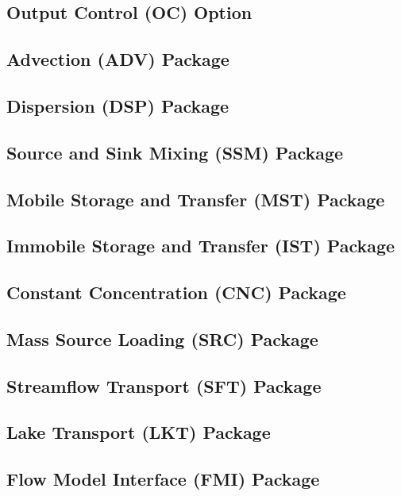 \newpage
\subsection{Output Control (OC) Option}


\newpage
\subsection{Advection (ADV) Package}


\newpage
\subsection{Dispersion (DSP) Package}


\newpage
\subsection{Source and Sink Mixing (SSM) Package}


\newpage
\subsection{Mobile Storage and Transfer (MST) Package}


\newpage
\subsection{Immobile Storage and Transfer (IST) Package}


\newpage
\subsection{Constant Concentration (CNC) Package}


\newpage
\subsection{Mass Source Loading (SRC) Package}


\newpage
\subsection{Streamflow Transport (SFT) Package}


\newpage
\subsection{Lake Transport (LKT) Package}


\newpage
\subsection{Flow Model Interface (FMI) Package}


%


